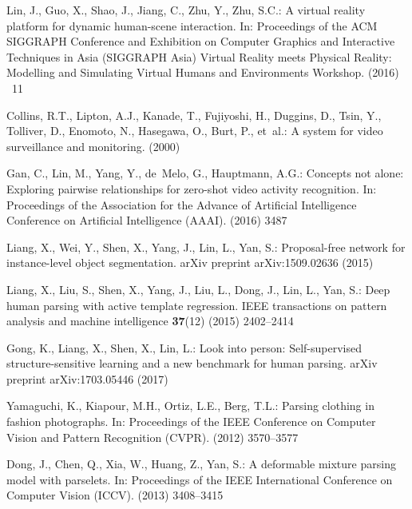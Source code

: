 \documentclass[10pt, letterpaper]{article}
\begin{document}

\begin{thebibliography}{10}
Lin, J., Guo, X., Shao, J., Jiang, C., Zhu, Y., Zhu, S.C.:
\newblock A virtual reality platform for dynamic human-scene interaction.
\newblock In: Proceedings of the ACM SIGGRAPH Conference and Exhibition on
  Computer Graphics and Interactive Techniques in Asia (SIGGRAPH Asia) Virtual
  Reality meets Physical Reality: Modelling and Simulating Virtual Humans and
  Environments Workshop. (2016) ~11

Collins, R.T., Lipton, A.J., Kanade, T., Fujiyoshi, H., Duggins, D., Tsin, Y.,
  Tolliver, D., Enomoto, N., Hasegawa, O., Burt, P.,  et~al.:
\newblock A system for video surveillance and monitoring.
\newblock (2000)

Gan, C., Lin, M., Yang, Y., de~Melo, G., Hauptmann, A.G.:
\newblock Concepts not alone: Exploring pairwise relationships for zero-shot
  video activity recognition.
\newblock In: Proceedings of the Association for the Advance of Artificial
  Intelligence Conference on Artificial Intelligence (AAAI). (2016)  3487

Liang, X., Wei, Y., Shen, X., Yang, J., Lin, L., Yan, S.:
\newblock Proposal-free network for instance-level object segmentation.
\newblock arXiv preprint arXiv:1509.02636 (2015)

Liang, X., Liu, S., Shen, X., Yang, J., Liu, L., Dong, J., Lin, L., Yan, S.:
\newblock Deep human parsing with active template regression.
\newblock IEEE transactions on pattern analysis and machine intelligence
  \textbf{37}(12) (2015)  2402--2414

Gong, K., Liang, X., Shen, X., Lin, L.:
\newblock Look into person: Self-supervised structure-sensitive learning and a
  new benchmark for human parsing.
\newblock arXiv preprint arXiv:1703.05446 (2017)

Yamaguchi, K., Kiapour, M.H., Ortiz, L.E., Berg, T.L.:
\newblock Parsing clothing in fashion photographs.
\newblock In: Proceedings of the IEEE Conference on Computer Vision and Pattern
  Recognition (CVPR). (2012)  3570--3577

Dong, J., Chen, Q., Xia, W., Huang, Z., Yan, S.:
\newblock A deformable mixture parsing model with parselets.
\newblock In: Proceedings of the IEEE International Conference on Computer
  Vision (ICCV). (2013)  3408--3415


\end{thebibliography}
\end{document}
